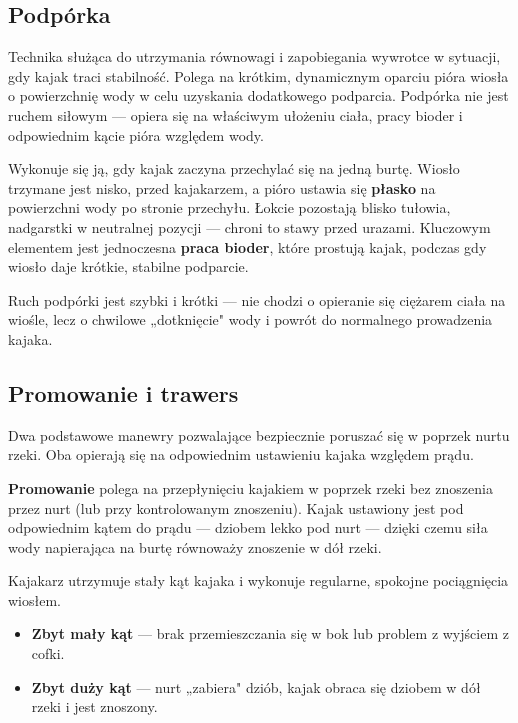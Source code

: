 \subsection{Podpórka}

Technika służąca do utrzymania równowagi i zapobiegania wywrotce w sytuacji, gdy kajak traci stabilność. Polega na krótkim, dynamicznym oparciu pióra wiosła o powierzchnię wody
w celu uzyskania dodatkowego podparcia. Podpórka nie jest ruchem siłowym — opiera się na właściwym ułożeniu ciała, pracy bioder i odpowiednim kącie pióra względem wody.

Wykonuje się ją, gdy kajak zaczyna przechylać się na jedną burtę. Wiosło trzymane jest nisko, przed kajakarzem, a pióro ustawia się \textbf{płasko} na powierzchni wody po stronie
przechyłu. Łokcie pozostają blisko tułowia, nadgarstki w neutralnej pozycji — chroni to stawy przed urazami. Kluczowym elementem jest jednoczesna \textbf{praca bioder}, które
prostują kajak, podczas gdy wiosło daje krótkie, stabilne podparcie.

\begin{tipbox}
  Ruch podpórki jest szybki i krótki — nie chodzi o opieranie się ciężarem ciała na wiośle, lecz o chwilowe „dotknięcie" wody i powrót do normalnego prowadzenia kajaka.
\end{tipbox}

\subsection{Promowanie i trawers}

Dwa podstawowe manewry pozwalające bezpiecznie poruszać się w poprzek nurtu rzeki. Oba opierają się na odpowiednim ustawieniu kajaka względem prądu.

\textbf{Promowanie} polega na przepłynięciu kajakiem w poprzek rzeki bez znoszenia przez nurt (lub przy kontrolowanym znoszeniu). Kajak ustawiony jest pod odpowiednim kątem do prądu — dziobem lekko pod nurt — dzięki czemu siła wody napierająca na burtę równoważy
znoszenie w dół rzeki.

Kajakarz utrzymuje stały kąt kajaka i wykonuje regularne, spokojne pociągnięcia wiosłem.

\begin{itemize}[leftmargin=1.5em, itemsep=2pt]
  \item \textbf{Zbyt mały kąt} — brak przemieszczania się w bok lub problem z wyjściem z cofki.
  \item \textbf{Zbyt duży kąt} — nurt „zabiera" dziób, kajak obraca się dziobem w dół rzeki i jest znoszony.
\end{itemize}


